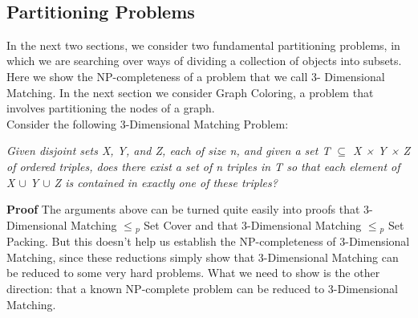 \documentclass{article}
\begin{document}
\\

\subsection{Partitioning Problems}
In the next two sections, we consider two fundamental partitioning problems, in which we are searching over ways of dividing a collection of objects into
subsets. Here we show the NP-completeness of a problem that we call 3- Dimensional Matching. In the next section we consider Graph Coloring, a problem that involves partitioning the nodes of a graph.\\

Consider the following 3-Dimensional Matching Problem:\\

\begin{center}
    \emph{Given disjoint sets X, Y, and Z, each of size n, and given a set T $\subseteq$ X × Y × Z of ordered triples, does there exist a set of n triples in T so that each element of X $\cup$ Y $\cup$ Z is contained in exactly one of these triples?}
\end{center}

\textbf{Proof} The arguments above can be turned quite easily into proofs that 3-Dimensional Matching $\le$$_p$ Set Cover and that 3-Dimensional Matching $\le$$_p$ Set Packing. But this doesn’t help us establish the NP-completeness of 3-Dimensional Matching, since these reductions simply show that 3-Dimensional Matching can be reduced to some very hard problems. What we need to show is the other direction: that a known NP-complete problem can be reduced to 3-Dimensional Matching.\\

\begin{center}
\end{center}
\end{document}
